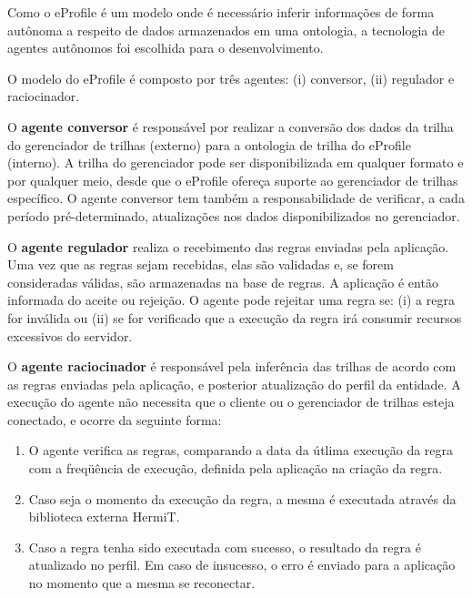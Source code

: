 Como o eProfile é um modelo onde é necessário inferir informações de forma autônoma a respeito de dados armazenados em uma ontologia, a tecnologia de agentes autônomos foi escolhida para o desenvolvimento.

O modelo do eProfile é composto por três agentes: (i) conversor, (ii) regulador e raciocinador.

O \textbf{agente conversor} é responsável por realizar a conversão dos dados da trilha do gerenciador de trilhas (externo) para a ontologia de trilha do eProfile (interno). A trilha do gerenciador pode ser disponibilizada em qualquer formato e por qualquer meio, desde que o eProfile ofereça suporte ao gerenciador de trilhas específico. O agente conversor tem também a responsabilidade de verificar, a cada período pré-determinado, atualizações nos dados disponibilizados no gerenciador.

O \textbf{agente regulador} realiza o recebimento das regras enviadas pela aplicação. Uma vez que as regras sejam recebidas, elas são validadas e, se forem consideradas válidas, são armazenadas na base de regras. A aplicação é então informada do aceite ou rejeição. O agente pode rejeitar uma regra se: (i) a regra for inválida ou (ii) se for verificado que a execução da regra irá consumir recursos excessivos do servidor.

O \textbf{agente raciocinador} é responsável pela inferência das trilhas de acordo com as regras enviadas pela aplicação, e posterior atualização do perfil da entidade. A execução do agente não necessita que o cliente ou o gerenciador de trilhas esteja conectado, e ocorre da seguinte forma:

\begin{enumerate}

\item O agente verifica as regras, comparando a data da útlima execução da regra com a freqüência de execução, definida pela aplicação na criação da regra.

\item Caso seja o momento da execução da regra, a mesma é executada através da biblioteca externa HermiT\cite{motik09}.

\item Caso a regra tenha sido executada com sucesso, o resultado da regra é atualizado no perfil. Em caso de insucesso, o erro é enviado para a aplicação no momento que a mesma se reconectar.

\end{enumerate}
